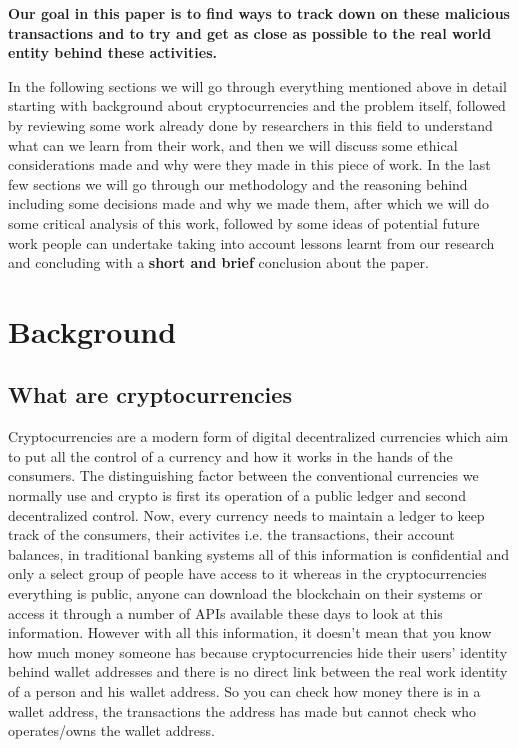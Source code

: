 \documentclass{article}
\begin{document}
\textbf{Our goal in this paper is to find ways to track down on these malicious transactions and to try and get as close as possible to the real world entity behind these activities.}

In the following sections we will go through everything mentioned above in detail starting with background about cryptocurrencies and the problem itself, followed by reviewing some work already done by researchers in this field to understand what can we learn from their work, and then we will discuss some ethical considerations made and why were they made in this piece of work. In the last few sections we will go through our methodology and the reasoning behind including some decisions made and why we made them, after which we will do some critical analysis of this work, followed by some ideas of potential future work people can undertake taking into account lessons learnt from our research and concluding with a \textbf{short and brief} conclusion about the paper.

\pagebreak
\section{Background}

\subsection{What are cryptocurrencies}
Cryptocurrencies are a modern form of digital decentralized currencies which aim to put all the control of a currency and how it works in the hands of the consumers. The distinguishing factor between the conventional currencies we normally use and crypto is first its operation of a public ledger and second decentralized control. Now, every currency needs to maintain a ledger to keep track of the consumers, their activites i.e. the transactions, their account balances, in traditional banking systems all of this information is confidential and only a select group of people have access to it whereas in the cryptocurrencies everything is public, anyone can download the blockchain on their systems or access it through a number of APIs available these days to look at this information. However with all this information, it doesn't mean that you know how much money someone has because cryptocurrencies hide their users' identity behind wallet addresses and there is no direct link between the real work identity of a person and his wallet address. So you can check how money there is in a wallet address, the transactions the address has made but cannot check who operates/owns the wallet address.
\end{document}
